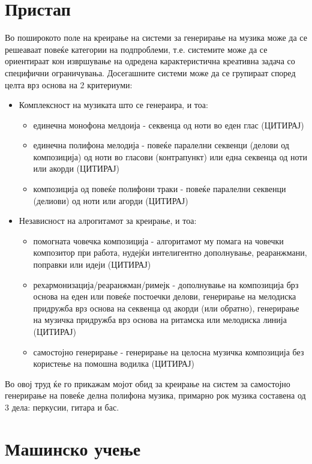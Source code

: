\chapter{Пристап}
\label{ch:pristap}

Во поширокото поле на креирање на системи за генерирање на музика може да се решеаваат повеќе категории на подпроблеми, т.е. системите може да се ориентираат кон извршување на одредена карактеристична креативна задача со специфични ограничувања. Досегашните системи може да се групираат според целта врз основа на 2 критериуми:
\begin{itemize}
    \item Комплексност на музиката што се генераира, и тоа: \begin{itemize}
        \item единечна монофона мелдоија - секвенца од ноти во еден глас (ЦИТИРАЈ)
        \item единечна полифона мелодија - повеќе паралелни секвенци (делови од композиција) од ноти во гласови (контрапункт) или една секвенца од ноти или акорди (ЦИТИРАЈ)
        \item композиција од повеќе полифони траки - повеќе паралелни секвенци (делиови) од ноти или агорди (ЦИТИРАЈ)
    \end{itemize}
    \item Независност на алрогитамот за креирање, и тоа: \begin{itemize}
        \item помогната човечка композиција - алгоритамот му помага на човечки композитор при работа, нудејќи интелигентно дополнување, реаранжмани, поправки или идеји (ЦИТИРАЈ)
        \item рехармонизација/реаранжман/римејк - дополнување на композиција брз основа на еден или повеќе постоечки делови, генерирање на мелодиска придружба врз основа на секвенца од акорди (или обратно), генерирање на музичка придружба врз основа на ритамска или мелодиска линија (ЦИТИРАЈ)
        \item самостојно генерирање - генерирање на целосна музичка композиција без користење на помошна водилка (ЦИТИРАЈ)
    \end{itemize}
\end{itemize}

Во овој труд ќе го прикажам мојот обид за креирање на систем за самостојно генерирање на повеќе делна полифона музика, примарно рок музика составена од 3 дела: перкусии, гитара и бас.

\chapter{Машинско учење}
\label{ch:masinsko}


